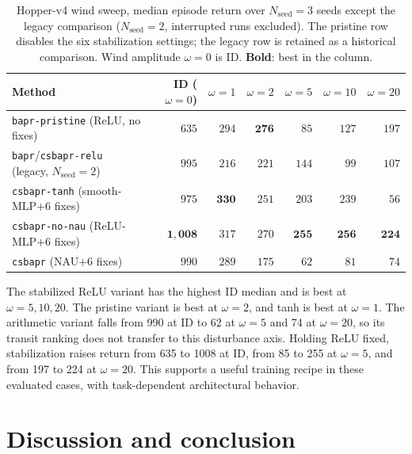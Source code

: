 \documentclass[10pt]{article}
\begin{document}
\begin{table}[htbp]
\centering
\scriptsize
\caption{Hopper-v4 wind sweep, median episode return over $N_{\mathrm{seed}}=3$ seeds except the legacy comparison ($N_{\mathrm{seed}}=2$, interrupted runs excluded). The pristine row disables the six stabilization settings; the legacy row is retained as a historical comparison. Wind amplitude $\omega=0$ is ID. \textbf{Bold}: best in the column.}
\label{tab:hopper}
\begin{tabular}{lrrrrrr}
\toprule
Method & ID ($\omega{=}0$) & $\omega{=}1$ & $\omega{=}2$ & $\omega{=}5$ & $\omega{=}10$ & $\omega{=}20$ \\
\midrule
\texttt{bapr-pristine} (ReLU, no fixes)              & $635$  & $294$           & $\mathbf{276}$           & $85$            & $127$           & $197$           \\
\texttt{bapr}/\texttt{csbapr-relu} (legacy, $N_{\mathrm{seed}}{=}2$)  & $995$  & $216$           & $221$           & $144$           & $99$            & $107$           \\
\texttt{csbapr-tanh} (smooth-MLP$+$6 fixes)           & $975$  & $\mathbf{330}$  & $251$           & $203$           & $239$           & $56$            \\
\texttt{csbapr-no-nau} (ReLU-MLP$+$6 fixes)           & $\mathbf{1{,}008}$ & $317$           & $270$  & $\mathbf{255}$  & $\mathbf{256}$  & $\mathbf{224}$  \\
\texttt{csbapr} (NAU$+$6 fixes)                       & $990$              & $289$           & $175$           & $62$            & $81$            & $74$            \\
\bottomrule
\end{tabular}
\end{table}

The stabilized ReLU variant has the highest ID median and is best at $\omega=5,10,20$. The pristine variant is best at $\omega=2$, and tanh is best at $\omega=1$. The arithmetic variant falls from 990 at ID to 62 at $\omega=5$ and 74 at $\omega=20$, so its transit ranking does not transfer to this disturbance axis. Holding ReLU fixed, stabilization raises return from 635 to 1008 at ID, from 85 to 255 at $\omega=5$, and from 197 to 224 at $\omega=20$. This supports a useful training recipe in these evaluated cases, with task-dependent architectural behavior.

\FloatBarrier

\section{Discussion and conclusion}
\label{sec:conclusion}
\end{document}

